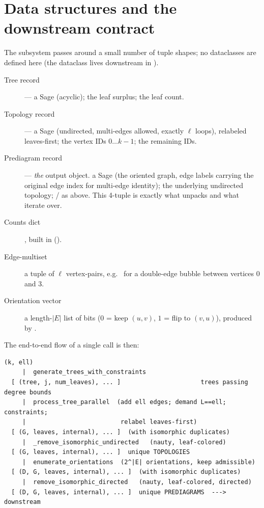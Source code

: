 \section{Data structures and the downstream contract}

The subsystem passes around a small number of tuple shapes; no dataclasses are
defined here (the  dataclass lives downstream in
).

\begin{description}
  \item[Tree record]  ---  a Sage
         (acyclic);  the leaf surplus;  the leaf count.
  \item[Topology record]  ---  a Sage
         (undirected, multi-edges allowed, exactly $\ell$ loops),
        relabeled leaves-first;  the vertex IDs $0\ldots k-1$;
         the remaining IDs.
  \item[Prediagram record]  --- \emph{the} output
        object.  a Sage  (the oriented graph, edge labels
        carrying the original edge index for multi-edge identity);  the
        underlying undirected topology;  /  as above.
        This 4-tuple is exactly what
         unpacks and what
         iterate over.
  \item[Counts dict] ,
        built in  ().
  \item[Edge-multiset] a tuple of $\ell$ vertex-pairs, e.g.\ 
        for a double-edge bubble between vertices $0$ and $3$.
  \item[Orientation vector] a length-$|E|$ list of bits ($0$ = keep $(u,v)$,
        $1$ = flip to $(v,u)$), produced by .
\end{description}

The end-to-end flow of a single  call is then:

\begin{lstlisting}[style=console]
  (k, ell)
     |  generate_trees_with_constraints
  [ (tree, j, num_leaves), ... ]                      trees passing degree bounds
     |  process_tree_parallel  (add ell edges; demand L==ell; constraints;
     |                          relabel leaves-first)
  [ (G, leaves, internal), ... ]  (with isomorphic duplicates)
     |  _remove_isomorphic_undirected   (nauty, leaf-colored)
  [ (G, leaves, internal), ... ]  unique TOPOLOGIES
     |  enumerate_orientations  (2^|E| orientations, keep admissible)
  [ (D, G, leaves, internal), ... ]  (with isomorphic duplicates)
     |  remove_isomorphic_directed   (nauty, leaf-colored, directed)
  [ (D, G, leaves, internal), ... ]  unique PREDIAGRAMS  --->  downstream
\end{lstlisting}

